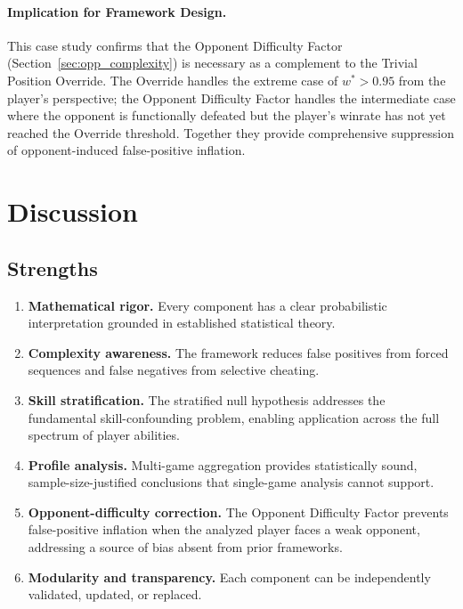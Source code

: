 \documentclass[11pt,a4paper]{article}
\begin{document}
\paragraph{Implication for Framework Design.}
This case study confirms that the Opponent Difficulty Factor
(Section~\ref{sec:opp_complexity}) is necessary as a complement to the
Trivial Position Override. The Override handles the extreme case of
$w^* > 0.95$ from the player's perspective; the Opponent Difficulty Factor
handles the intermediate case where the opponent is functionally defeated
but the player's winrate has not yet reached the Override threshold.
Together they provide comprehensive suppression of opponent-induced
false-positive inflation.


\section{Discussion}
\label{sec:discussion}

\subsection{Strengths}

\begin{enumerate}
    \item \textbf{Mathematical rigor.} Every component has a clear probabilistic
          interpretation grounded in established statistical theory.
    \item \textbf{Complexity awareness.} The framework reduces false positives
          from forced sequences and false negatives from selective cheating.
    \item \textbf{Skill stratification.} The stratified null hypothesis
          addresses the fundamental skill-confounding problem, enabling
          application across the full spectrum of player abilities.
    \item \textbf{Profile analysis.} Multi-game aggregation provides
          statistically sound, sample-size-justified conclusions that
          single-game analysis cannot support.
    \item \textbf{Opponent-difficulty correction.} The Opponent Difficulty
          Factor prevents false-positive inflation when the analyzed player
          faces a weak opponent, addressing a source of bias absent from
          prior frameworks.
    \item \textbf{Modularity and transparency.} Each component can be
          independently validated, updated, or replaced.
\end{enumerate}
\end{document}

